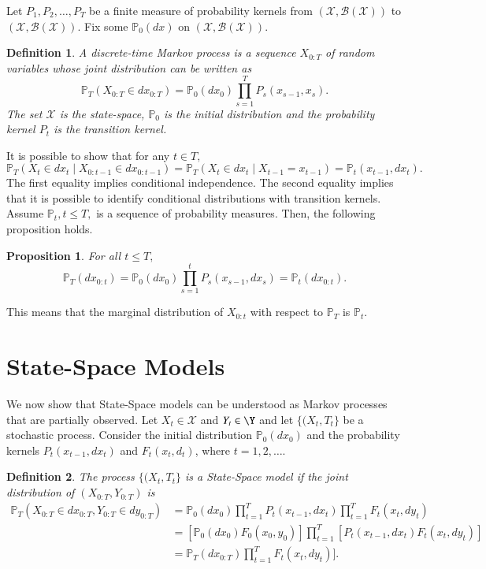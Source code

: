 \documentclass[
]{book}
\theoremstyle{break}
\newtheorem{proposition}{Proposition}
\newtheorem{definition}{Definition}
\theoremstyle{nonumberplain}
\newtheorem{definition}{Definition}
\begin{document}
Let \(P_1, P_2, \dots, P_T\) be a finite measure of probability kernels
from \((\mathcal{X}, \mathcal{B}(\mathcal{X}))\) to
\((\mathcal{X}, \mathcal{B}(\mathcal{X})).\) Fix some
\(\mathbb{P}_0(dx)\) on \((\mathcal{X}, \mathcal{B}(\mathcal{X})).\)

\begin{definition}
A discrete-time Markov process is a sequence $X_{0:T}$ of random variables whose joint distribution can be written as
\begin{equation}
    \mathbb{P}_T(X_{0:T}\in dx_{0:T})=\mathbb{P}_0(dx_0)\prod\limits_{s=1}^T P_s(x_{s-1},x_s).
\end{equation}
The set $\mathcal{X}$ is the state-space, $\mathbb{P}_0$ is the initial distribution and the probability kernel $P_t$ is the transition kernel.
\end{definition}

It is possible to show that for any \(t\in T,\) \[
\mathbb{P}_T(X_t\in dx_t\mid X_{0:t-1}\in dx_{0:t-1})=
\mathbb{P}_T(X_t\in dx_t\mid X_{t-1}=x_{t-1})=\mathbb{P}_t(x_{t-1},dx_t).
\] The first equality implies conditional independence. The second
equality implies that it is possible to identify conditional
distributions with transition kernels. Assume \(\mathbb{P}_t, t\leq T,\)
is a sequence of probability measures. Then, the following proposition
holds.

\begin{proposition}
For all $t\leq T,$ 
$$
\mathbb{P}_T(dx_{0:t})=\mathbb{P}_0(dx_0)\prod\limits_{s=1}^t P_s(x_{s-1},dx_s)=\mathbb{P}_t(dx_{0:t}).
$$
\end{proposition}

This means that the marginal distribution of \(X_{0:t}\) with respect to
\(\mathbb{P}_T\) is \(\mathbb{P}_t.\)

\section{State-Space Models}

We now show that State-Space models can be understood as Markov
processes that are partially observed. Let \(X_t\in\mathcal X\) and
\(Y_t\in\Y\) and let \(\{(X_t,T_t\}\) be a stochastic process. Consider
the initial distribution \(\mathbb{P}_0(dx_0)\) and the probability
kernels \(P_t(x_{t-1},dx_t)\) and \(F_t(x_t,d_t)\), where
\(t=1,2,\dots\).

\begin{definition}
The process $\{(X_t,T_t\}$ is a State-Space model if the joint distribution of $(X_{0:T},Y_{0:T})$ is 
\begin{align*}
  \mathbb{P}_T(X_{0:T}\in dx_{0:T},Y_{0:T}\in dy_{0:T}) &= \mathbb{P}_0(dx_0)\prod\limits_{t=1}^T P_t(x_{t-1},dx_t)\prod\limits_{t=1}^T F_t(x_t,dy_t)\\
  &= [\mathbb{P}_0(dx_0)F_0(x_0,y_0)]\prod\limits_{t=1}^T[P_t(x_{t-1},dx_t)F_t(x_t,dy_t)] \\
  &= \mathbb{P}_T(dx_{0:T})\prod \limits_{t=1}^T F_t(x_t,dy_t)].
\end{align*}
\end{definition}
\end{document}
